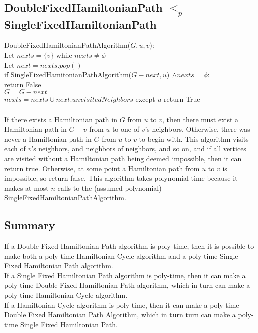 \documentclass[letterpaper,notitlepage,twoside]{article}
\newcommand{\union}{\cup}
\newcommand\tab[1][1cm]{\hspace*{#1}} %
\begin{document}
\subsection*{DoubleFixedHamiltonianPath $\leq_p$ SingleFixedHamiltonianPath}
DoubleFixedHamiltonianPathAlgorithm($G, u, v$):\\
\tab Let $nexts = \{v\}$
\tab while $nexts \neq \phi$ \\
\tab\tab Let $next = nexts.pop()$ \\
\tab\tab if SingleFixedHamitonianPathAlgorithm($G - next, u$) $\land nexts = \phi$:\\
\tab\tab\tab return False\\
\tab\tab $G = G - next$\\
\tab\tab $nexts = nexts \union next.unvisitedNeighbors$ except $u$
\tab return True
\\\\
If there exists a Hamiltonian path in $G$ from $u$ to $v$, then there must exist a Hamiltonian path in $G - v$ from $u$ to one of $v$'s neighbors. Otherwise, there was never a Hamiltonian path in $G$ from $u$ to $v$ to begin with. This algorithm visits each of $v$'s neighbors, and neighbors of neighbors, and so on, and if all vertices are visited without a Hamiltonian path being deemed impossible, then it can return true. Otherwise, at some point a Hamiltonian path from $u$ to $v$ is impossible, so return false. This algorithm takes polynomial time because it makes at most $n$ calls to the (assumed polynomial) SingleFixedHamiltonianPathAlgorithm.

\subsection*{Summary}
If a Double Fixed Hamiltonian Path algorithm is poly-time, then it is possible to make both a poly-time Hamiltonian Cycle algorithm and a poly-time Single Fixed Hamiltonian Path algorithm.\\
If a Single Fixed Hamiltonian Path algorithm is poly-time, then it can make a poly-time Double Fixed Hamiltonian Path algorithm, which in turn can make a poly-time Hamiltonian Cycle algorithm. \\
If a Hamiltonian Cycle algorithm is poly-time, then it can make a poly-time Double Fixed Hamiltonian Path Algorithm, which in turn turn can make a poly-time Single Fixed Hamiltonian Path.
\end{document}
